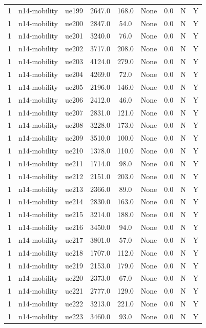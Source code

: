 \begin{table}[ht]
\begin{tabular}{|c|c|c|c|c|c|c|c|c|}
1 & n14-mobility & ue199 & 2647.0 & 168.0 & None & 0.0 & N & Y \\
1 & n14-mobility & ue200 & 2847.0 & 54.0 & None & 0.0 & N & Y \\
1 & n14-mobility & ue201 & 3240.0 & 76.0 & None & 0.0 & N & Y \\
1 & n14-mobility & ue202 & 3717.0 & 208.0 & None & 0.0 & N & Y \\
1 & n14-mobility & ue203 & 4124.0 & 279.0 & None & 0.0 & N & Y \\
1 & n14-mobility & ue204 & 4269.0 & 72.0 & None & 0.0 & N & Y \\
1 & n14-mobility & ue205 & 2196.0 & 146.0 & None & 0.0 & N & Y \\
1 & n14-mobility & ue206 & 2412.0 & 46.0 & None & 0.0 & N & Y \\
1 & n14-mobility & ue207 & 2831.0 & 121.0 & None & 0.0 & N & Y \\
1 & n14-mobility & ue208 & 3228.0 & 173.0 & None & 0.0 & N & Y \\
1 & n14-mobility & ue209 & 3510.0 & 100.0 & None & 0.0 & N & Y \\
1 & n14-mobility & ue210 & 1378.0 & 110.0 & None & 0.0 & N & Y \\
1 & n14-mobility & ue211 & 1714.0 & 98.0 & None & 0.0 & N & Y \\
1 & n14-mobility & ue212 & 2151.0 & 203.0 & None & 0.0 & N & Y \\
1 & n14-mobility & ue213 & 2366.0 & 89.0 & None & 0.0 & N & Y \\
1 & n14-mobility & ue214 & 2830.0 & 163.0 & None & 0.0 & N & Y \\
1 & n14-mobility & ue215 & 3214.0 & 188.0 & None & 0.0 & N & Y \\
1 & n14-mobility & ue216 & 3450.0 & 94.0 & None & 0.0 & N & Y \\
1 & n14-mobility & ue217 & 3801.0 & 57.0 & None & 0.0 & N & Y \\
1 & n14-mobility & ue218 & 1707.0 & 112.0 & None & 0.0 & N & Y \\
1 & n14-mobility & ue219 & 2153.0 & 179.0 & None & 0.0 & N & Y \\
1 & n14-mobility & ue220 & 2373.0 & 67.0 & None & 0.0 & N & Y \\
1 & n14-mobility & ue221 & 2777.0 & 129.0 & None & 0.0 & N & Y \\
1 & n14-mobility & ue222 & 3213.0 & 221.0 & None & 0.0 & N & Y \\
1 & n14-mobility & ue223 & 3460.0 & 93.0 & None & 0.0 & N & Y \\

\end{tabular}
\end{table}
